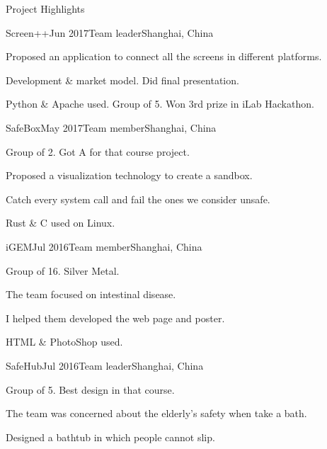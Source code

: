 \documentclass{resume} %
\begin{document}
\begin{rSection}{Project Highlights}

\begin{rSubsection}
  {Screen++}{Jun 2017}{Team leader}{Shanghai, China}
    \item Proposed an application to connect all the screens in different platforms.
    \item Development \& market model. Did final presentation.
    \item Python \& Apache used. Group of 5. Won 3rd prize in iLab Hackathon.
\end{rSubsection}


\begin{rSubsection}
  {SafeBox}{May 2017}{Team member}{Shanghai, China}
    \item Group of 2. Got A for that course project.
    \item Proposed a visualization technology to create a sandbox.
    \item Catch every system call and fail the ones we consider unsafe.
    \item Rust \& C used on Linux.
\end{rSubsection}


\begin{rSubsection}
  {iGEM}{Jul 2016}{Team member}{Shanghai, China}
    \item Group of 16. Silver Metal.
    \item The team focused on intestinal disease.
    \item I helped them developed the web page and poster.
    \item HTML \& PhotoShop used.
\end{rSubsection}


\begin{rSubsection}
  {SafeHub}{Jul 2016}{Team leader}{Shanghai, China}
    \item Group of 5. Best design in that course.
    \item The team was concerned about the elderly's safety when take a bath.
    \item Designed a bathtub in which people cannot slip.
\end{rSubsection}
\end{rSection}
\end{document}
